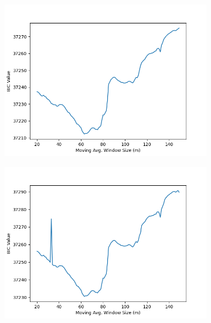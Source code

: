 \documentclass[12pt]{article}
\begin{document}
\begin{figure}[!ht]
  \begin{subfigure}[!ht]{0.45\textwidth}
    \includegraphics[width=\linewidth]{Prop_Both_Cr}
  \end{subfigure}\hfill
  \begin{subfigure}[!ht]{0.45\textwidth}
    \includegraphics[width=\linewidth]{Both_Cr}
  \end{subfigure}


\end{figure}
\end{document}
